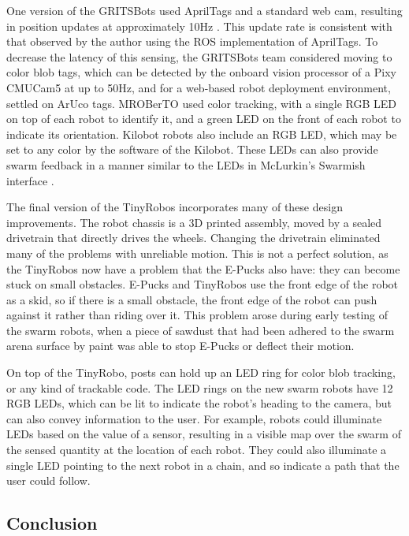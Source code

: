 One version of the GRITSBots used AprilTags and a standard web cam, resulting in position updates at approximately 10Hz \citep{PickemGrits2014}. 
This update rate is consistent with that observed by the author using the ROS implementation of AprilTags. 
To decrease the latency of this sensing, the GRITSBots team considered moving to color blob tags, which can be detected by the onboard vision processor of a Pixy CMUCam5 at up to 50Hz, and for a web-based robot deployment environment, settled on ArUco tags\citep{pickem2017robotarium}. 
MROBerTO used color tracking, with a single RGB LED on top of each robot to identify it, and a green LED on the front of each robot to indicate its orientation. 
Kilobot robots also include an RGB LED, which may be set to any color by the software of the Kilobot. 
These LEDs can also provide swarm feedback in a manner similar to the LEDs in McLurkin's Swarmish interface \citep{mclurkin2006speaking}.

The final version of the TinyRobos incorporates many of these design improvements. 
The robot chassis is a 3D printed assembly, moved by a sealed drivetrain that directly drives the wheels. 
Changing the drivetrain eliminated many of the problems with unreliable motion. 
This is not a perfect solution, as the TinyRobos now have a problem that the E-Pucks also have: they can become stuck on small obstacles. 
E-Pucks and TinyRobos use the front edge of the robot as a skid, so if there is a small obstacle, the front edge of the robot can push against it rather than riding over it. 
This problem arose during early testing of the swarm robots, when a piece of sawdust that had been adhered to the swarm arena surface by paint was able to stop E-Pucks or deflect their motion. 

On top of the TinyRobo, posts can hold up an LED ring for color blob tracking, or any kind of trackable code. 
The LED rings on the new swarm robots have 12 RGB LEDs, which can be lit to indicate the robot's heading to the camera, but can also convey information to the user. 
For example, robots could illuminate LEDs based on the value of a sensor, resulting in a visible map over the swarm of the sensed quantity at the location of each robot. 
They could also illuminate a single LED pointing to the next robot in a chain, and so indicate a path that the user could follow.

\subsection{Conclusion}

